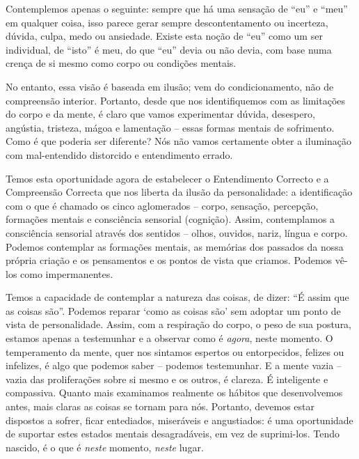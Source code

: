 Contemplemos apenas o seguinte: sempre que há uma sensação de ``eu'' e ``meu''
em qualquer coisa, isso parece gerar sempre descontentamento ou incerteza,
dúvida, culpa, medo ou ansiedade. Existe esta noção de ``eu'' como um ser
individual, de ``isto'' é meu, do que ``eu'' devia ou não devia, com base numa
crença de si mesmo como corpo ou condições mentais.

No entanto, essa visão é baseada em ilusão; vem do condicionamento, não de
compreensão interior. Portanto, desde que nos identifiquemos com as limitações
do corpo e da mente, é claro que vamos experimentar dúvida, desespero, angústia,
tristeza, mágoa e lamentação -- essas formas mentais de sofrimento. Como é que
poderia ser diferente? Nós não vamos certamente obter a iluminação com
mal-entendido distorcido e entendimento errado.

Temos esta oportunidade agora de estabelecer o Entendimento Correcto e a
Compreensão Correcta que nos liberta da ilusão da personalidade: a identificação
com o que é chamado os cinco aglomerados -- corpo, sensação, percepção,
formações mentais e consciência sensorial (cognição). Assim, contemplamos a
consciência sensorial através dos sentidos -- olhos, ouvidos, nariz, língua e
corpo. Podemos contemplar as formações mentais, as memórias dos passados da
nossa própria criação e os pensamentos e os pontos de vista que criamos. Podemos
vê-los como impermanentes.

Temos a capacidade de contemplar a natureza das coisas, de dizer: ``É assim que
as coisas são''. Podemos reparar `como as coisas são' sem adoptar um ponto de
vista de personalidade. Assim, com a respiração do corpo, o peso de sua postura,
estamos apenas a testemunhar e a observar como é \emph{agora}, neste momento. O
temperamento da mente, quer nos sintamos espertos ou entorpecidos, felizes ou
infelizes, é algo que podemos saber -- podemos testemunhar. E a mente vazia --
vazia das proliferações sobre si mesmo e os outros, é clareza. É inteligente e
compassiva. Quanto mais examinamos realmente os hábitos que desenvolvemos antes,
mais claras as coisas se tornam para nós. Portanto, devemos estar dispostos a
sofrer, ficar entediados, miseráveis e angustiados: é uma oportunidade de
suportar estes estados mentais desagradáveis, em vez de suprimi-los. Tendo
nascido, é o que é \emph{neste} momento, \emph{neste} lugar.

